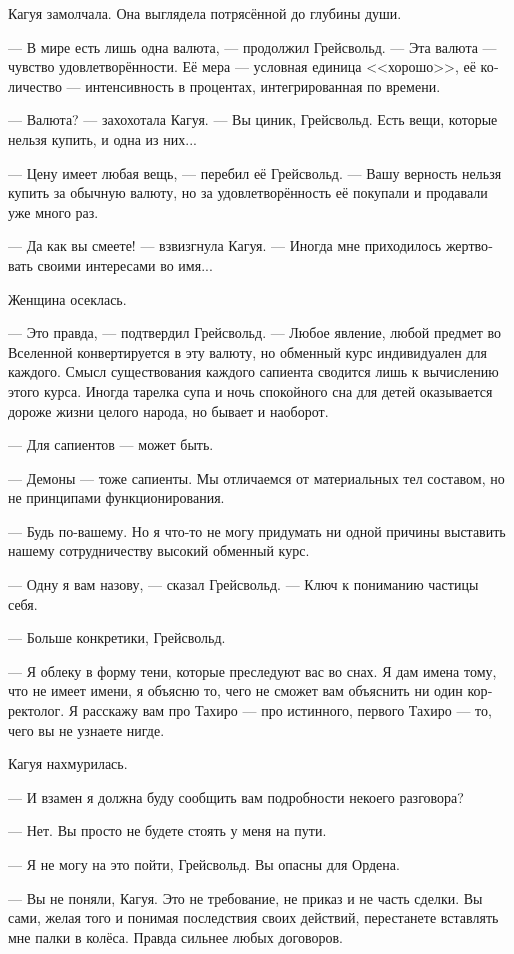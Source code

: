 \documentclass[a4paper,12pt,fleqn]{book}\usepackage{polyglossia}\setdefaultlanguage[babelshorthands=true]{russian}\setotherlanguage{english}\defaultfontfeatures{Ligatures=TeX,Mapping=tex-text}\usepackage{xcolor}\newcommand{\ml}[3]{#2}
\begin{document}
Кагуя замолчала.
Она выглядела потрясённой до глубины души.

--- В мире есть лишь одна валюта, --- продолжил Грейсвольд.
--- Эта валюта --- чувство удовлетворённости.
Её мера --- условная единица <<хорошо>>, её количество --- интенсивность в процентах, интегрированная по времени.

--- Валюта? --- захохотала Кагуя.
--- Вы циник, Грейсвольд.
Есть вещи, которые нельзя купить, и одна из них...

--- Цену имеет любая вещь, --- перебил её Грейсвольд.
--- Вашу верность нельзя купить за обычную валюту, но за удовлетворённость её покупали и продавали уже много раз.

--- Да как вы смеете! --- взвизгнула Кагуя.
--- Иногда мне приходилось жертвовать своими интересами во имя...

Женщина осеклась.

--- Это правда, --- подтвердил Грейсвольд.
--- Любое явление, любой предмет во Вселенной конвертируется в эту валюту, но обменный курс индивидуален для каждого.
Смысл существования каждого сапиента сводится лишь к вычислению этого курса.
Иногда тарелка супа и ночь спокойного сна для детей оказывается дороже жизни целого народа, но бывает и наоборот.

--- Для сапиентов --- может быть.

--- Демоны --- тоже сапиенты.
Мы отличаемся от материальных тел составом, но не принципами функционирования.

--- Будь по-вашему.
Но я что-то не могу придумать ни одной причины выставить нашему сотрудничеству высокий обменный курс.

--- Одну я вам назову, --- сказал Грейсвольд.
--- Ключ к пониманию частицы себя.

--- Больше конкретики, Грейсвольд.

--- Я облеку в форму тени, которые преследуют вас во снах.
Я дам имена тому, что не имеет имени, я объясню то, чего не сможет вам объяснить ни один корректолог.
Я расскажу вам про Тахиро --- про истинного, первого Тахиро --- то, чего вы не узнаете нигде.

Кагуя нахмурилась.

--- И взамен я должна буду сообщить вам подробности некоего разговора?

--- Нет.
Вы просто не будете стоять у меня на пути.

--- Я не могу на это пойти, Грейсвольд.
Вы опасны для Ордена.

--- Вы не поняли, Кагуя.
Это не требование, не приказ и не часть сделки.
Вы сами, желая того и понимая последствия своих действий, перестанете вставлять мне палки в колёса.
Правда сильнее любых договоров.
\end{document}
